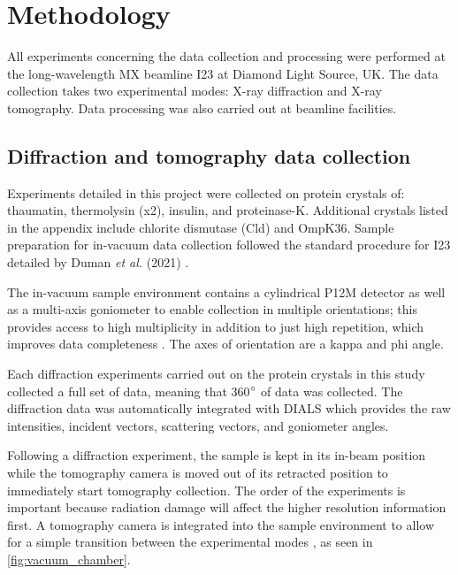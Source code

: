\section{Methodology}\label{sec:methodology}

All experiments concerning the data collection and processing were performed at the long-wavelength MX beamline I23 at Diamond Light Source, UK. The data collection takes two experimental modes: X-ray diffraction and X-ray tomography. Data processing was also carried out at beamline facilities. %

\subsection{Diffraction and tomography data collection}

Experiments detailed in this project were collected on protein crystals of: thaumatin, thermolysin (x2), insulin, and proteinase-K. Additional crystals listed in the appendix include chlorite dismutase (Cld) and OmpK36.
Sample preparation for in-vacuum data collection followed the standard procedure for I23 detailed by Duman \textit{et al.} (2021) \cite{Duman2021}.

The in-vacuum sample environment contains a cylindrical P12M detector as well as a multi-axis goniometer to enable collection  in multiple orientations; this provides access to high multiplicity in addition to just high repetition, which improves data completeness \cite{Finke2016}. The axes of orientation are a kappa and phi angle. %

Each diffraction experiments carried out on the protein crystals in this study collected a full set of data, meaning that 360$\degree$ of data was collected. The diffraction data was automatically integrated with DIALS which provides the raw intensities, incident vectors, scattering vectors, and goniometer angles.

Following a diffraction experiment, the sample is kept in its in-beam position while the tomography camera is moved out of its retracted position to immediately start tomography collection. The order of the experiments is important because radiation damage will affect the higher resolution information first. A tomography camera is integrated into the sample environment to allow for a simple transition between the experimental modes \cite{Kazantsev2021}, as seen in \cref{fig:vacuum_chamber}.

